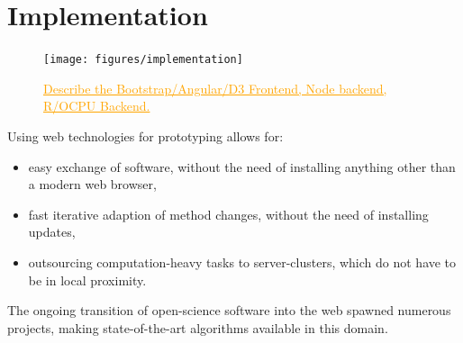 \documentclass[journal]{style/vgtc} 			          %
\newcommand{\com}[1]{\textcolor{orange}{\uline{#1}}}
\begin{document}

\section{Implementation} \label{implementation}
\begin{figure}[htb]
 \centering
 \texttt{[image: figures/implementation]}
 \caption{
 \com{Describe the Bootstrap/Angular/D3 Frontend, Node backend, R/OCPU Backend.}
 }
  \label{fig:Implementation}
\end{figure}
Using web technologies for prototyping allows for:
\begin{itemize}
	\item easy exchange of software, without the need of installing anything other than a modern web browser,
	\item fast iterative adaption of method changes, without the need of installing updates,
	\item outsourcing computation-heavy tasks to server-clusters, which do not have to be in local proximity.
\end{itemize}
The ongoing transition of open-science software into the web spawned numerous projects, making state-of-the-art algorithms available in this domain.
\end{document}
